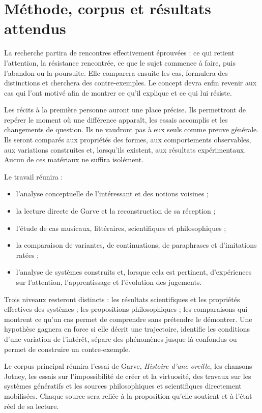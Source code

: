 \documentclass[11pt,a4paper]{article}
\begin{document}
\section{Méthode, corpus et résultats attendus}

La recherche partira de rencontres effectivement éprouvées : ce qui retient
l'attention, la résistance rencontrée, ce que le sujet commence à faire, puis
l'abandon ou la poursuite. Elle comparera ensuite les cas, formulera des
distinctions et cherchera des contre-exemples. Le concept devra enfin revenir
aux cas qui l'ont motivé afin de montrer ce qu'il explique et ce qui lui
résiste.

Les récits à la première personne auront une place précise. Ils permettront de
repérer le moment où une différence apparaît, les essais accomplis et les
changements de question. Ils ne vaudront pas à eux seuls comme preuve générale.
Ils seront comparés aux propriétés des formes, aux comportements observables,
aux variations construites et, lorsqu'ils existent, aux résultats
expérimentaux. Aucun de ces matériaux ne suffira isolément.

Le travail réunira :

\begin{itemize}
  \item l'analyse conceptuelle de l'intéressant et des notions voisines ;
  \item la lecture directe de Garve et la reconstruction de sa réception ;
  \item l'étude de cas musicaux, littéraires, scientifiques et philosophiques ;
  \item la comparaison de variantes, de continuations, de paraphrases et
        d'imitations ratées ;
  \item l'analyse de systèmes construits et, lorsque cela est pertinent,
        d'expériences sur l'attention, l'apprentissage et l'évolution des
        jugements.
\end{itemize}

Trois niveaux resteront distincts : les résultats scientifiques et les
propriétés effectives des systèmes ; les propositions philosophiques ; les
comparaisons qui montrent ce qu'un cas permet de comprendre sans prétendre le
démontrer. Une hypothèse gagnera en force si elle décrit une trajectoire,
identifie les conditions d'une variation de l'intérêt, sépare des phénomènes
jusque-là confondus ou permet de construire un contre-exemple.

Le corpus principal réunira l'essai de Garve, \emph{Histoire d'une oreille}, les
chansons Jotney, les essais sur l'impossibilité de créer et la virtuosité, des
travaux sur les systèmes génératifs et les sources philosophiques et
scientifiques directement mobilisées. Chaque source sera reliée à la
proposition qu'elle soutient et à l'état réel de sa lecture.
\end{document}
